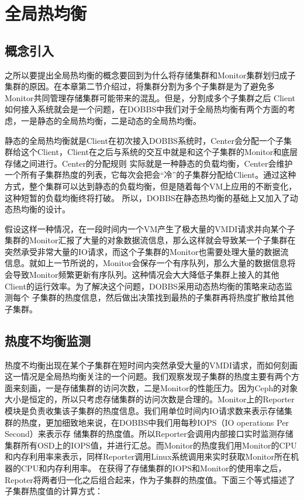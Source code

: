 \section{全局热均衡}
\subsection{概念引入}
之所以要提出全局热均衡的概念要回到为什么将存储集群和Monitor集群划归成子集群的原因。在本章第二节介绍过，将集群分割为多个子集群是为了避免多Monitor共同管理存储集群可能带来的混乱。但是，分割成多个子集群之后
Client如何接入系统就会是一个问题，在DOBBS中我们对于全局热均衡有两个方面的考虑，一是静态的全局热均衡，二是动态的全局热均衡。

静态的全局热均衡就是Client在初次接入DOBBS系统时，Center会分配一个子集群给这个Client，Client在之后与系统的交互中就是和这个子集群的Monitor和底层存储之间进行。Center的分配规则
实际就是一种静态的负载均衡，Center会维护一个所有子集群热度的列表，它每次会把会“冷”的子集群分配给Client。通过这种方式，整个集群可以达到静态的负载均衡，但是随着每个VM上应用的不断变化，这种短暂的负载均衡终将打破。
所以，DOBBS在静态热均衡的基础上又加入了动态热均衡的设计。

假设这样一种情况，在一段时间内一个VM产生了极大量的VMDI请求并向某个子集群的Monitor汇报了大量的对象数据流信息，那么这样就会导致某一个子集群在突然承受非常大量的IO请求，而这个子集群的Monitor也需要处理大量的数据流
信息。就如上一节所说的，Monitor会保存一个有序队列，那么大量的数据信息将会导致Monitor频繁更新有序队列。这种情况会大大降低子集群上接入的其他Client的运行效率。为了解决这个问题，DOBBS采用动态热均衡的策略来动态监测每个
子集群的热度信息，然后做出决策找到最热的子集群再将热度扩散给其他子集群。

\subsection{热度不均衡监测}
热度不均衡出现在某个子集群在短时间内突然承受大量的VMDI请求，而如何刻画这一情况是全局热均衡关注的一个问题。我们观察发现子集群的热度主要有两个方面来刻画，一是存储集群的访问次数，二是Monitor的性能压力。因为Ceph的对象
大小是恒定的，所以只考虑存储集群的访问次数是合理的。Monitor上的Reporter模块是负责收集该子集群的热度信息。我们用单位时间内IO请求数来表示存储集群的热度，更加细致地来说，在DOBBS中我们用每秒IOPS（IO operations Per Second）来表示存
储集群的热度值。所以Reporter会调用内部接口实时监测存储集群所有OSD上的IOPS值，并进行汇总。而Monitor的热度我们用Monitor的CPU和内存利用率来表示，同样Reporter调用Linux系统调用来实时获取Monitor所在机器的CPU和内存利用率。
在获得了存储集群的IOPS和Monitor的使用率之后，Repoter将两者归一化之后组合起来，作为子集群的热度值。下面三个等式描述了子集群热度值的计算方式：


